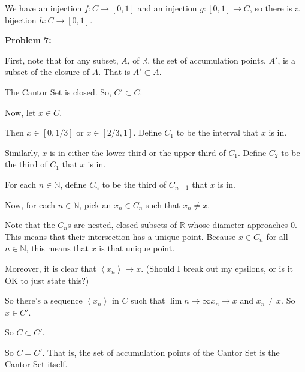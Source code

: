 \documentclass[a4paper,12pt]{article}
\newcommand{\tab}{\hspace{4mm}} %
\newcommand{\shunt}{\vspace{20mm}}
\newcommand{\anbrack}[1]{\left\langle #1 \right\rangle}
\newcommand{\N}{\mathbb{N}}
\newcommand{\R}{\mathbb{R}}
\begin{document}
We have an injection $f: C \to [0,1]$ and an injection $g: [0,1] \to C$, so there is a bijection $h: C \to [0,1]$.

\shunt

{\bf Problem 7:}

First, note that for any subset, $A$, of $\R$, the set of accumulation points, $A'$, is a subset of the closure of $A$. That is $A' \subset \overline{A}$.

The Cantor Set is closed. So, $C' \subset C$.

Now, let $x \in C$.

\tab Then $x \in [0,1/3]$ or $x \in [2/3, 1]$. Define $C_1$ to be the interval that $x$ is in.

\tab Similarly, $x$ is in either the lower third or the upper third of $C_1$. Define $C_2$ to be the third of $C_1$ that $x$ is in.

\tab For each $n \in \N$, define $C_n$ to be the third of $C_{n-1}$ that $x$ is in.

\tab Now, for each $n \in \N$, pick an $x_n \in C_n$ such that $x_n \neq x$.

\tab Note that the $C_n$s are nested, closed subsets of $\R$ whose diameter approaches $0$. This means that their intersection has a unique point. Because $x \in C_n$ for all $n \in \N$, this means that $x$ is that unique point.

\tab Moreover, it is clear that $\anbrack{x_n} \to x$. (Should I break out my epsilons, or is it OK to just state this?)

\tab So there's a sequence $\anbrack{x_n}$ in $C$ such that $\lim\limits{n \to \infty} x_n \to x$ and $x_n \neq x$. So $x \in C'$.

So $C \subset C'$.

So $C = C'$. That is, the set of accumulation points of the Cantor Set is the Cantor Set itself.

\shunt
\end{document}
